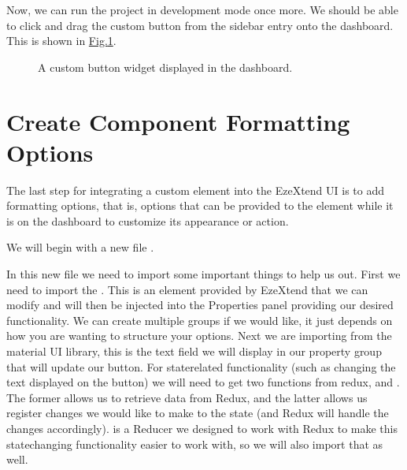 \documentclass[letterpaper,10pt,english]{sphinxmanual}
\begin{document}
\sphinxAtStartPar
Now, we can run the project in development mode once more. We should be able to click and drag the custom button from the sidebar entry onto the dashboard. This is shown in \hyperref[\detokenize{custom_component/create_component:create-component}]{Fig.\@ \ref{\detokenize{custom_component/create_component:create-component}}}.

\begin{figure}[htbp]
\centering
\capstart

\noindent{}
\caption{A custom button widget displayed in the dashboard.}\label{\detokenize{custom_component/create_component:id1}}\label{\detokenize{custom_component/create_component:create-component}}\end{figure}

\begin{DUlineblock}{0em}
\item[] 
\end{DUlineblock}

\sphinxstepscope


\section{Create Component Formatting Options}
\label{\detokenize{custom_component/formatting_options:create-component-formatting-options}}\label{\detokenize{custom_component/formatting_options::doc}}
\sphinxAtStartPar
The last step for integrating a custom element into the EzeXtend UI is to add formatting options, that is, options that can be provided to the element while it is on the dashboard to customize its appearance or action.

\sphinxAtStartPar
We will begin with a new file .

\sphinxAtStartPar
In this new file we need to import some important things to help us out. First we need to import the . This is an element provided by EzeXtend that we can modify and will then be injected into the Properties panel providing our desired functionality. We can create multiple groups if we would like, it just depends on how you are wanting to structure your options. Next we are importing  from the material UI library, this is the text field we will display in our property group that will update our button. For state\sphinxhyphen{}related functionality (such as changing the text displayed on the button) we will need to get two functions from redux,  and . The former allows us to retrieve data from Redux, and the latter allows us register changes we would like to make to the state (and Redux will handle the changes accordingly).  is a Reducer we designed to work with Redux to make this state\sphinxhyphen{}changing functionality easier to work with, so we will also import that as well.
\end{document}

